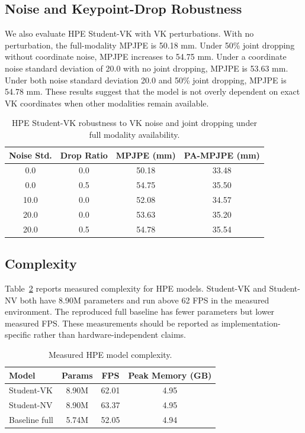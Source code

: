 \documentclass[journal]{IEEEtran}
\newcommand{\mpjpe}{MPJPE}
\newcommand{\pampjpe}{PA-MPJPE}
\begin{document}
\subsection{Noise and Keypoint-Drop Robustness}

We also evaluate HPE Student-VK with VK perturbations. With no perturbation, the full-modality \mpjpe{} is 50.18 mm. Under 50\% joint dropping without coordinate noise, \mpjpe{} increases to 54.75 mm. Under a coordinate noise standard deviation of 20.0 with no joint dropping, \mpjpe{} is 53.63 mm. Under both noise standard deviation 20.0 and 50\% joint dropping, \mpjpe{} is 54.78 mm. These results suggest that the model is not overly dependent on exact VK coordinates when other modalities remain available.

\begin{table}[t]
\centering
\caption{HPE Student-VK robustness to VK noise and joint dropping under full modality availability.}
\label{tab:noise}
\begin{tabular}{cccc}
\toprule
Noise Std. & Drop Ratio & \mpjpe{} (mm) & \pampjpe{} (mm) \\
\midrule
0.0 & 0.0 & 50.18 & 33.48 \\
0.0 & 0.5 & 54.75 & 35.50 \\
10.0 & 0.0 & 52.08 & 34.57 \\
20.0 & 0.0 & 53.63 & 35.20 \\
20.0 & 0.5 & 54.78 & 35.54 \\
\bottomrule
\end{tabular}
\end{table}

\subsection{Complexity}

Table~\ref{tab:complexity} reports measured complexity for HPE models. Student-VK and Student-NV both have 8.90M parameters and run above 62 FPS in the measured environment. The reproduced full baseline has fewer parameters but lower measured FPS. These measurements should be reported as implementation-specific rather than hardware-independent claims.

\begin{table}[t]
\centering
\caption{Measured HPE model complexity.}
\label{tab:complexity}
\begin{tabular}{lccc}
\toprule
Model & Params & FPS & Peak Memory (GB) \\
\midrule
Student-VK & 8.90M & 62.01 & 4.95 \\
Student-NV & 8.90M & 63.37 & 4.95 \\
Baseline full & 5.74M & 52.05 & 4.94 \\
\bottomrule
\end{tabular}
\end{table}
\end{document}
